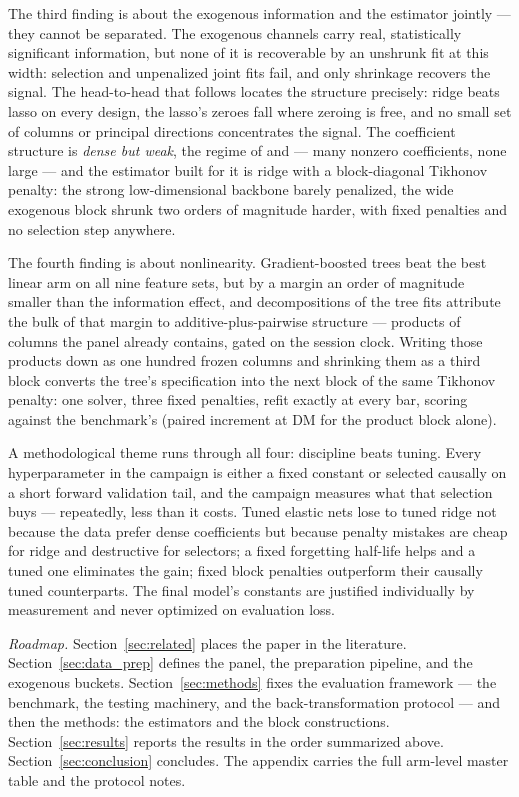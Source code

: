 The third finding is about the exogenous information and the estimator
jointly --- they cannot be separated. The exogenous channels carry
real, statistically significant information, but none of it is
recoverable by an unshrunk fit at this width: selection and unpenalized
joint fits fail, and only shrinkage recovers the signal. The head-to-head that
follows locates the structure precisely: ridge beats lasso on every
design, the lasso's zeroes fall where zeroing is free, and no small set
of columns or principal directions concentrates the signal. The
coefficient structure is \emph{dense but weak}, the regime of
\citet{GiannoneLenzaPrimiceri2021} and \citet{ShenXiu2025} --- many nonzero
coefficients, none large --- and the estimator built for it is ridge
with a block-diagonal Tikhonov penalty: the
strong low-dimensional backbone barely penalized, the wide exogenous
block shrunk two orders of magnitude harder, with fixed penalties and
no selection step anywhere.

The fourth finding is about nonlinearity. Gradient-boosted trees beat
the best linear arm on all nine feature sets, but by a margin an order
of magnitude smaller than the information effect, and decompositions of
the tree fits attribute the bulk of that margin to additive-plus-pairwise
structure --- products of columns the panel already contains, gated on
the session clock. Writing those products down as one hundred frozen
columns and shrinking them as a third block converts the tree's
specification into the next block of the same Tikhonov penalty:
one solver, three fixed penalties, refit exactly at
every bar, scoring \unifBlkThreeUserQLIKE{} against the benchmark's
\unifAzeroQLIKE{} (paired increment \unifIncrBlkThreeUserDQ{} at DM
\unifIncrBlkThreeUserDM{} for the product block alone).

A methodological theme runs through all four: discipline beats tuning.
Every hyperparameter in the campaign is either a fixed constant or
selected causally on a short forward validation tail, and the campaign
measures what that selection buys --- repeatedly, less than it costs.
Tuned elastic nets lose to tuned ridge not because the data prefer dense
coefficients but because penalty mistakes are cheap for ridge and
destructive for selectors; a fixed forgetting half-life helps and a
tuned one eliminates the gain; fixed block penalties outperform their
causally tuned counterparts. The final model's constants are justified
individually by measurement and never optimized on evaluation loss.

\emph{Roadmap.} Section~\ref{sec:related} places the paper in the
literature. Section~\ref{sec:data_prep} defines the panel, the
preparation pipeline, and the exogenous buckets.
Section~\ref{sec:methods} fixes the evaluation framework --- the
benchmark, the testing machinery, and the back-transformation protocol ---
and then the methods: the estimators and
the block constructions. Section~\ref{sec:results} reports the
results in the order summarized above.
Section~\ref{sec:conclusion} concludes. The appendix carries the full
arm-level master table and the protocol notes.
